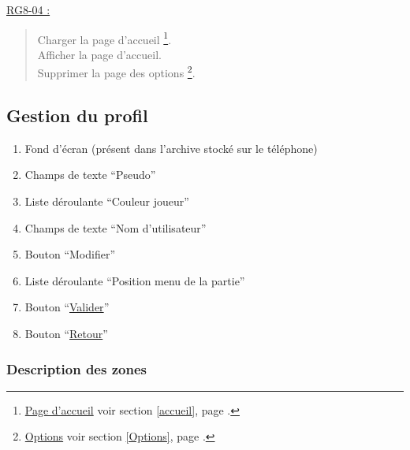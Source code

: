 \documentclass{report}
\begin{document}
				
			\underline{RG8-04 :}
				\begin{quote}
					Charger la page d'accueil%
						\footnote[3]{
							\hyperlink{Page d'accueil}{Page d'accueil}
							\og voir section \ref{accueil}, page \pageref{accueil}.\fg
						}.\\
					Afficher la page d'accueil\footnotemark[3].\\
					Supprimer la page des options%
						\footnote[2]{
							\hyperlink{Options}{Options}
							\og voir section \ref{Options}, page \pageref{Options}.\fg
						}.\\		
				\end{quote}
\newpage

	\subsection{Gestion du profil}
	
		\hypertarget{Gestion du profil}{}
		\label{Gestion du profil}
		
		\begin{center}
			
		\end{center}
				
		\begin{enumerate}
		  \item Fond d'écran (présent dans l'archive stocké sur le téléphone)
		  \item Champs de texte ``Pseudo''
		  \item Liste déroulante ``Couleur joueur''
		  \item Champs de texte ``Nom d'utilisateur''
		  \item Bouton ``Modifier''
		  \item Liste déroulante ``Position menu de la partie''
		  \item Bouton ``\hyperlink{Options}{Valider}''
		  \item Bouton ``\hyperlink{Options}{Retour}''
		\end{enumerate}

		\subsubsection{Description des zones}
		
\end{document}
